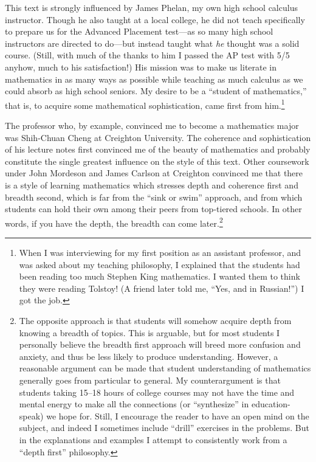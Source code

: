 This text is strongly influenced by James Phelan, 
my own high school calculus
instructor. Though he also taught at a local college,
he did not teach specifically to prepare us for the
Advanced Placement test---as so many high school instructors
are directed to do---but
instead taught what {\it he} thought was a solid course.  
(Still, with much of the thanks to him
I passed the AP test with 5/5 anyhow, much to his  
satisfaction!)  His mission was to make us literate in mathematics
in as many ways as possible while teaching as much calculus as
we could absorb as high school seniors.
My desire to be a ``student of mathematics,'' that is, to 
acquire some mathematical sophistication, came first from
him.\footnote{When I was interviewing for my first
position as an assistant professor, and was asked about my teaching
philosophy, I explained
that the students had been reading too much Stephen King mathematics.
I wanted them to think they were reading Tolstoy!  
(A friend later told me, ``Yes, and in Russian!'')
I got the job.}  

The professor who, by example, convinced me to 
become a mathematics major was Shih-Chuan Cheng at Creighton
University.  The coherence and sophistication of his lecture notes
first convinced me of the beauty of mathematics and probably
constitute the single greatest influence on the style of this text.
Other coursework under John Mordeson and James Carlson at
Creighton convinced me that there is a style of learning 
mathematics which stresses depth and coherence first
and breadth second, which is far from the ``sink or swim''
approach, and from which students can hold their own
among their peers from top-tiered schools.  In other words,
if you have the depth, the breadth can come later.\footnote{%
The opposite approach is that students will somehow
acquire depth from knowing a breadth of topics.
This is arguable, but for most students I personally believe
the breadth first approach will breed more confusion and
anxiety, and thus be less likely to produce understanding.
However, a reasonable argument can be made that student
understanding of mathematics generally goes from particular
to general.  My counterargument is that students taking
15--18 hours of college courses may not have the time
and mental energy to make all the connections (or ``synthesize''
in education-speak) we hope
for.  Still, I encourage the reader to have an open mind
on the subject, and indeed I sometimes include ``drill''
exercises in the problems.  But in the explanations and examples I 
attempt to consistently work from a ``depth first'' philosophy.}

